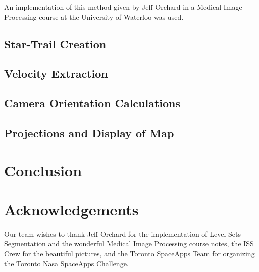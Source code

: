 \documentclass[12pt]{article}
\theoremstyle{definition}
\begin{document}
An implementation of this method given by Jeff Orchard in a Medical Image Processing course at the University of Waterloo was used. 

\subsection{ \bf Star-Trail Creation }


\subsection{ \bf Velocity Extraction }


\subsection{ \bf Camera Orientation Calculations }


\subsection{ \bf Projections and Display of Map }



\section{ \bf Conclusion }



\section{ \bf Acknowledgements }

Our team wishes to thank Jeff Orchard for the implementation of Level Sets Segmentation and the wonderful Medical Image Processing course notes, the ISS Crew for the beautiful pictures, and the Toronto SpaceApps Team for organizing the Toronto Nasa SpaceApps Challenge.

%




\end{document}
